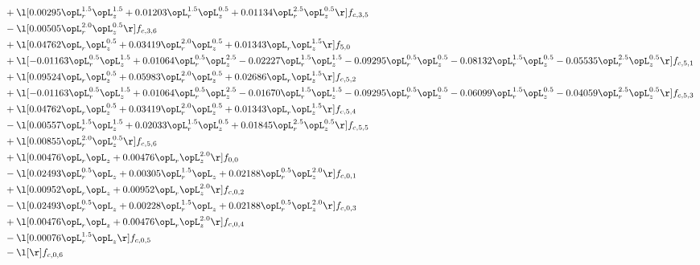 \begin{alignat}{2}
& + \l[  0.00295 \opL_r^{1.5} \opL_z^{1.5} +  0.01203 \opL_r^{1.5} \opL_z^{0.5} +  0.01134 \opL_r^{2.5} \opL_z^{0.5}  \r] f_{c,3,5} \nonumber \\ 
& - \l[  0.00505 \opL_r^{2.0} \opL_z^{0.5}  \r] f_{c,3,6} \nonumber \\ 
& + \l[  0.04762 \opL_r \opL_z^{0.5} +  0.03419 \opL_r^{2.0} \opL_z^{0.5} +  0.01343 \opL_r \opL_z^{1.5}  \r] f_{5,0} \nonumber \\ 
& + \l[  -0.01163 \opL_r^{0.5} \opL_z^{1.5} +  0.01064 \opL_r^{0.5} \opL_z^{2.5}   -0.02227 \opL_r^{1.5} \opL_z^{1.5}   -0.09295 \opL_r^{0.5} \opL_z^{0.5}   -0.08132 \opL_r^{1.5} \opL_z^{0.5}   -0.05535 \opL_r^{2.5} \opL_z^{0.5}  \r] f_{c,5,1} \nonumber \\ 
& + \l[  0.09524 \opL_r \opL_z^{0.5} +  0.05983 \opL_r^{2.0} \opL_z^{0.5} +  0.02686 \opL_r \opL_z^{1.5}  \r] f_{c,5,2} \nonumber \\ 
& + \l[  -0.01163 \opL_r^{0.5} \opL_z^{1.5} +  0.01064 \opL_r^{0.5} \opL_z^{2.5}   -0.01670 \opL_r^{1.5} \opL_z^{1.5}   -0.09295 \opL_r^{0.5} \opL_z^{0.5}   -0.06099 \opL_r^{1.5} \opL_z^{0.5}   -0.04059 \opL_r^{2.5} \opL_z^{0.5}  \r] f_{c,5,3} \nonumber \\ 
& + \l[  0.04762 \opL_r \opL_z^{0.5} +  0.03419 \opL_r^{2.0} \opL_z^{0.5} +  0.01343 \opL_r \opL_z^{1.5}  \r] f_{c,5,4} \nonumber \\ 
& - \l[  0.00557 \opL_r^{1.5} \opL_z^{1.5} +  0.02033 \opL_r^{1.5} \opL_z^{0.5} +  0.01845 \opL_r^{2.5} \opL_z^{0.5}  \r] f_{c,5,5} \nonumber \\ 
& + \l[  0.00855 \opL_r^{2.0} \opL_z^{0.5}  \r] f_{c,5,6} \nonumber \\ 
& + \l[  0.00476 \opL_r \opL_z +  0.00476 \opL_r \opL_z^{2.0}  \r] f_{0,0} \nonumber \\ 
& - \l[  0.02493 \opL_r^{0.5} \opL_z +  0.00305 \opL_r^{1.5} \opL_z +  0.02188 \opL_r^{0.5} \opL_z^{2.0}  \r] f_{c,0,1} \nonumber \\ 
& + \l[  0.00952 \opL_r \opL_z +  0.00952 \opL_r \opL_z^{2.0}  \r] f_{c,0,2} \nonumber \\ 
& - \l[  0.02493 \opL_r^{0.5} \opL_z +  0.00228 \opL_r^{1.5} \opL_z +  0.02188 \opL_r^{0.5} \opL_z^{2.0}  \r] f_{c,0,3} \nonumber \\ 
& + \l[  0.00476 \opL_r \opL_z +  0.00476 \opL_r \opL_z^{2.0}  \r] f_{c,0,4} \nonumber \\ 
& - \l[  0.00076 \opL_r^{1.5} \opL_z  \r] f_{c,0,5} \nonumber \\ 
& - \l[  \r] f_{c,0,6} \nonumber \\ 

\end{alignat}
